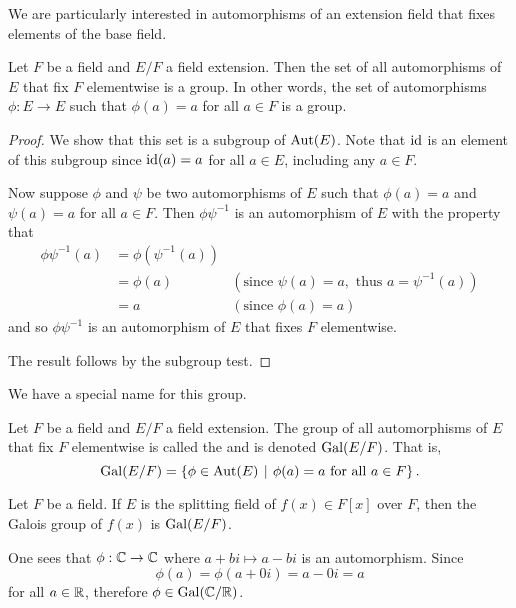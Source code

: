 We are particularly interested in automorphisms of an extension field that fixes elements of the base field.
\begin{proposition}\label{prop-galois-group-is-group}
    Let $F$ be a field and $E/F$ a field extension. Then the set of all automorphisms of $E$ that fix $F$ elementwise is a group. In other words, the set of automorphisms $\phi: E \to E$ such that $\phi(a) = a$ for all $a \in F$ is a group.
\end{proposition}
\begin{proof}
    We show that this set is a subgroup of $\mathrm{Aut}(E)$. Note that $\mathrm{id}$ is an element of this subgroup since $\mathrm{id}(a) = a$ for all $a \in E$, including any $a \in F$.

    Now suppose $\phi$ and $\psi$ be two automorphisms of $E$ such that $\phi(a) = a$ and $\psi(a) = a$ for all $a \in F$. Then $\phi\psi^{-1}$ is an automorphism of $E$ with the property that
    \begin{align*}
        \phi\psi^{-1}(a) &= \phi(\psi^{-1}(a))\\
        &= \phi(a) & (\text{since }\psi(a) = a, \text{ thus } a = \psi^{-1}(a))\\
        &= a & (\text{since }\phi(a) = a)
    \end{align*}
    and so $\phi\psi^{-1}$ is an automorphism of $E$ that fixes $F$ elementwise.

    The result follows by the subgroup test.
\end{proof}

We have a special name for this group.
\begin{definition}
    Let $F$ be a field and $E/F$ a field extension. The group of all automorphisms of $E$ that fix $F$ elementwise is called the  and is denoted $\mathrm{Gal}(E/F)$. That is,
    \[
        \Gal{E/F} = \left\{\phi \in \Aut{E} \vert \phi(a) = a \text{ for all } a \in F\right\}.
    \]
\end{definition}
\begin{remark}
    Let $F$ be a field. If $E$ is the splitting field of $f(x) \in F[x]$ over $F$, then the Galois group of $f(x)$ is $\mathrm{Gal}(E/F)$.
\end{remark}

\begin{example}
    One sees that $\phi: \mathbb{C} \to \mathbb{C}$ where $a+bi \mapsto a - bi$ is an automorphism. Since
    \[
        \phi(a) = \phi(a + 0i) = a - 0i = a
    \]
    for all $a \in \mathbb{R}$, therefore $\phi \in \mathrm{Gal}(\mathbb{C}/\mathbb{R})$.
\end{example}

